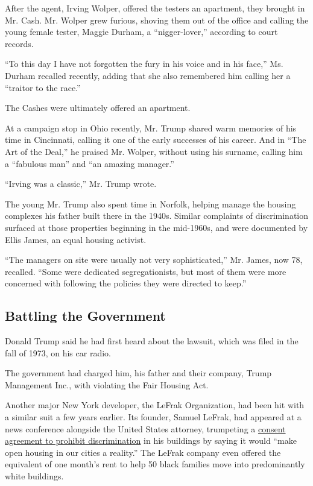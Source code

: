 After the agent, Irving Wolper, offered the testers an apartment, they
brought in Mr. Cash. Mr. Wolper grew furious, shoving them out of the
office and calling the young female tester, Maggie Durham, a
``nigger-lover,'' according to court records.

``To this day I have not forgotten the fury in his voice and in his
face,'' Ms. Durham recalled recently, adding that she also remembered
him calling her a ``traitor to the race.''

The Cashes were ultimately offered an apartment.

At a campaign stop in Ohio recently, Mr. Trump shared warm memories of
his time in Cincinnati, calling it one of the early successes of his
career. And in ``The Art of the Deal,'' he praised Mr. Wolper, without
using his surname, calling him a ``fabulous man'' and ``an amazing
manager.''

``Irving was a classic,'' Mr. Trump wrote.

The young Mr. Trump also spent time in Norfolk, helping manage the
housing complexes his father built there in the 1940s. Similar
complaints of discrimination surfaced at those properties beginning in
the mid-1960s, and were documented by Ellis James, an equal housing
activist.

``The managers on site were usually not very sophisticated,'' Mr. James,
now 78, recalled. ``Some were dedicated segregationists, but most of
them were more concerned with following the policies they were directed
to keep.''

\hypertarget{battling-the-government}{%
\subsection{Battling the Government}\label{battling-the-government}}

Donald Trump said he had first heard about the lawsuit, which was filed
in the fall of 1973, on his car radio.

The government had charged him, his father and their company, Trump
Management Inc., with violating the Fair Housing Act.

Another major New York developer, the LeFrak Organization, had been hit
with a similar suit a few years earlier. Its founder, Samuel LeFrak, had
appeared at a news conference alongside the United States attorney,
trumpeting a
\href{http://www.nytimes.com/1976/02/01/archives/lefrak-city-crucible-of-racial-change-lefrak-city-crucible-of.html}{consent
agreement to prohibit discrimination} in his buildings by saying it
would ``make open housing in our cities a reality.'' The LeFrak company
even offered the equivalent of one month's rent to help 50 black
families move into predominantly white buildings.

